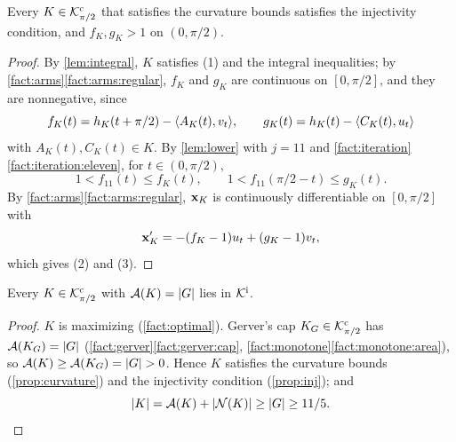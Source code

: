 \begin{proposition}[injectivity]\label{prop:inj}
Every $K\in\mathcal{K}^{\mathrm{c}}_{\pi/2}$ that satisfies the curvature bounds satisfies the
injectivity condition, and $f_K,g_K>1$ on $(0,\pi/2)$.
\end{proposition}

\begin{proof}
By \cref{lem:integral}, $K$ satisfies (1) and the integral inequalities; by
\cref{fact:arms}\ref{fact:arms:regular}, $f_K$ and $g_K$ are continuous on
$[0,\pi/2]$, and they are nonnegative, since
\[
  f_K(t)=h_K(t+\pi/2)-\langle A_K(t),v_t\rangle,\qquad g_K(t)=h_K(t)-\langle C_K(t),u_t\rangle
\]
with $A_K(t),C_K(t)\in K$. By \cref{lem:lower} with $j=11$ and
\cref{fact:iteration}\ref{fact:iteration:eleven}, for $t\in(0,\pi/2)$,
\[
  1<f_{11}(t)\le f_K(t),\qquad1<f_{11}(\pi/2-t)\le g_K(t).
\]
By \cref{fact:arms}\ref{fact:arms:regular}, $\mathbf{x}_K$ is continuously
differentiable on $[0,\pi/2]$ with
\[
  \mathbf{x}_K'=-(f_K-1)u_t+(g_K-1)v_t,
\]
which gives (2) and (3).
\end{proof}

\begin{corollary}\label{cor:Ki}
Every $K\in\mathcal{K}^{\mathrm{c}}_{\pi/2}$ with $\mathcal{A}(K)=\lvert G\rvert$ lies in $\mathcal{K}^{\mathrm{i}}$.
\end{corollary}

\begin{proof}
$K$ is maximizing (\cref{fact:optimal}). Gerver's cap $K_G\in\mathcal{K}^{\mathrm{c}}_{\pi/2}$ has
$\mathcal{A}(K_G)=\lvert G\rvert$ (\cref{fact:gerver}\ref{fact:gerver:cap},
\cref{fact:monotone}\ref{fact:monotone:area}), so $\mathcal{A}(K)\ge\mathcal{A}(K_G)=\lvert G\rvert>0$.
Hence $K$ satisfies the curvature bounds (\cref{prop:curvature}) and the
injectivity condition (\cref{prop:inj}); and
\[
  \lvert K\rvert=\mathcal{A}(K)+\lvert \mathcal{N}(K)\rvert\ge\lvert G\rvert\ge11/5.\qedhere
\]
\end{proof}
